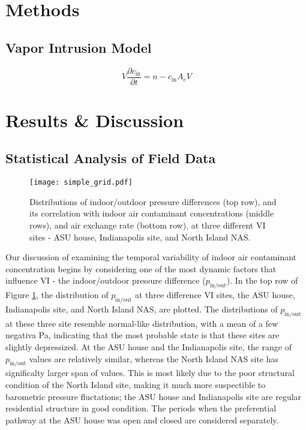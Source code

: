 \documentclass[journal=esthag,manuscript=article]{achemso}
\begin{document}
\section{Methods}

\subsection{Vapor Intrusion Model}

\begin{equation}
  V \frac{\partial c_\mathrm{in}}{\partial t} = n - c_\mathrm{in} A_e V \label{eq:indoor_air}
\end{equation}

\section{Results \& Discussion}

\subsection{Statistical Analysis of Field Data}

\begin{figure}[!h]
		\centering
    \caption{Distributions of indoor/outdoor pressure differences (top row), and its correlation with indoor air contaminant concentrations (middle rows), and air exchange rate (bottom row), at three different VI sites - ASU house, Indianapolis site, and North Island NAS.}
    \label{fig:pair_grid}
    \texttt{[image: simple\_grid.pdf]}
\end{figure}

Our discussion of examining the temporal variability of indoor air contaminant concentration begins by considering one of the most dynamic factors that influence VI - the indoor/outdoor pressure difference ($p_\mathrm{in/out}$).
In the top row of Figure \ref{fig:pair_grid}, the distribution of $p_\mathrm{in/out}$ at three difference VI sites, the ASU house, Indianapolis site, and North Island NAS, are plotted.
The distributions of $p_\mathrm{in/out}$ at these three site resemble normal-like distribution, with a mean of a few negativa Pa, indicating that the most probable state is that these sites are slightly depressized.
At the ASU house and the Indianapolis site, the range of $p_\mathrm{in/out}$ values are relatively similar, whereas the North Island NAS site has significalty larger span of values.
This is most likely due to the poor structural condition of the North Island site, making it much more suspectible to barometric pressure fluctations; the ASU house and Indianapolis site are regular residential structure in good condition.
The periods when the preferential pathway at the ASU house was open and closed are considered separately.
\end{document}
